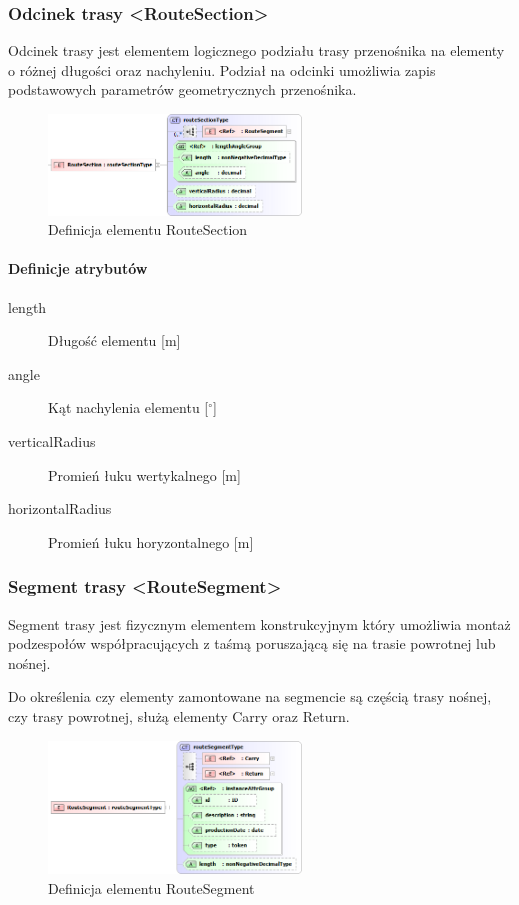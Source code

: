 \documentclass[12pt,a4paper]{article}
\begin{document}
\subsubsection{Odcinek trasy <RouteSection>}
Odcinek trasy jest elementem logicznego podziału trasy przenośnika na elementy o
różnej długości oraz nachyleniu. Podział na odcinki umożliwia zapis podstawowych
parametrów geometrycznych przenośnika.

\begin{figure}[H]
  \centering
  \includegraphics[width=0.6\textwidth]{png/liquid/RouteSection}
  \caption{Definicja elementu RouteSection}
  \label{fig:routeSection-xsd}
\end{figure}

\paragraph{Definicje atrybutów}
\begin{description}
\item[length] Długość elementu [m]
\item[angle] Kąt nachylenia elementu [$^\circ$]
\item[verticalRadius] Promień łuku wertykalnego [m]
\item[horizontalRadius] Promień łuku horyzontalnego [m]
\end{description}


\subsubsection{Segment trasy <RouteSegment>}
Segment trasy jest fizycznym elementem konstrukcyjnym który umożliwia montaż
podzespołów współpracujących z taśmą poruszającą się na trasie powrotnej lub
nośnej.

Do określenia czy elementy zamontowane na segmencie są częścią trasy nośnej, czy
trasy powrotnej, służą elementy Carry oraz Return.

\begin{figure}[H]
  \centering
  \includegraphics[width=0.6\textwidth]{png/liquid/RouteSegment}
  \caption{Definicja elementu RouteSegment}
  \label{fig:routeSegment-xsd}
\end{figure}
\end{document}
